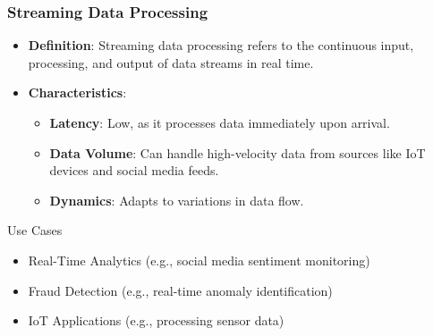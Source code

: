 \documentclass[aspectratio=169]{beamer}
\begin{document}
\begin{frame}[fragile]
    \frametitle{Streaming Data Processing}
    \begin{itemize}
        \item \textbf{Definition}: Streaming data processing refers to the continuous input, processing, and output of data streams in real time.
        \item \textbf{Characteristics}:
        \begin{itemize}
            \item \textbf{Latency}: Low, as it processes data immediately upon arrival.
            \item \textbf{Data Volume}: Can handle high-velocity data from sources like IoT devices and social media feeds.
            \item \textbf{Dynamics}: Adapts to variations in data flow.
        \end{itemize}
    \end{itemize}
    
    \begin{block}{Use Cases}
        \begin{itemize}
            \item Real-Time Analytics (e.g., social media sentiment monitoring)
            \item Fraud Detection (e.g., real-time anomaly identification)
            \item IoT Applications (e.g., processing sensor data)
        \end{itemize}
    \end{block}
\end{frame}
\end{document}
